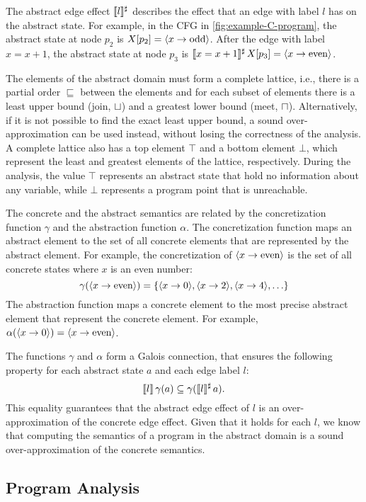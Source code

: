 The abstract edge effect $\llbracket l\rrbracket^\sharp$ describes the effect that an edge with label $l$ has on the abstract state.
For example, in the CFG in \cref{fig:example-C-program}, the abstract state at node $p_2$ is $X[p_2] = \langle x \rightarrow \text{odd}\rangle$.
After the edge with label $x = x+1$, the abstract state at node $p_3$ is $\llbracket x = x+1\rrbracket^\sharp\,X[p_3] = \langle x \rightarrow \text{even}\rangle$.

The elements of the abstract domain must form a complete lattice, i.e., there is a partial order $\sqsubseteq$ between the elements and for each subset of elements there is a least upper bound (join, $\sqcup$) and a greatest lower bound (meet, $\sqcap$).
Alternatively, if it is not possible to find the exact least upper bound, a sound over-approximation
can be used instead, without losing the correctness of the analysis.
A complete lattice also has a top element $\top$ and a bottom element $\bot$, which represent the least and greatest elements of the lattice, respectively.
During the analysis, the value $\top$ represents an abstract state that hold no information
about any variable, while $\bot$ represents a program point that is unreachable.

The concrete and the abstract semantics are related by the concretization function $\gamma$ and the abstraction function $\alpha$.
The concretization function maps an abstract element to the set of all concrete elements that are represented by the abstract element.
For example, the concretization of $\langle x \rightarrow \text{even}\rangle$ is the set of all concrete states where $x$ is an even number:
\[
  \gamma(\langle x \rightarrow \text{even}\rangle) = \{\langle x \rightarrow 0\rangle, \langle x \rightarrow 2\rangle, \langle x \rightarrow 4\rangle,\ldots\}
\]
The abstraction function maps a concrete element to the most precise abstract element that represent the concrete element. For example, $\alpha(\langle x \rightarrow 0\rangle) = \langle x \rightarrow \text{even}\rangle$.

The functions $\gamma$ and $\alpha$ form a Galois connection, that ensures the following property for each abstract state $a$ and each edge label $l$:
\[
  \llbracket l\rrbracket\,\gamma(a) \subseteq \gamma(\llbracket l\rrbracket^\sharp\,a).
\]
This equality guarantees that the abstract edge effect of $l$ is an over-approximation
of the concrete edge effect.
Given that it holds for each $l$, we know that computing the semantics of a program in the abstract domain is a sound
over-approximation of the concrete semantics.

\subsection{Program Analysis}

